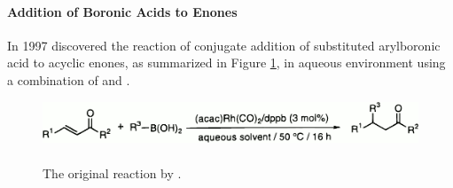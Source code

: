 % 
% 
% 
% 
% 






\paragraph{Addition of %
Boronic Acids to Enones}
In 1997 \citet{Sakai1997} discovered the reaction of conjugate addition of substituted arylboronic acid to acyclic enones, as summarized in 
Figure \ref{sc:1997-generico}, in aqueous environment using a combination of  and .

\ifpdf
\begin{figure}%
 \centering
 \includegraphics[width=.8\textwidth]{sc/1997-generico.png}
  \caption{\\The original reaction by \citet{Sakai1997}. \label{sc:1997-generico}}
\end{figure}
\else
\fignoeps
\fi



